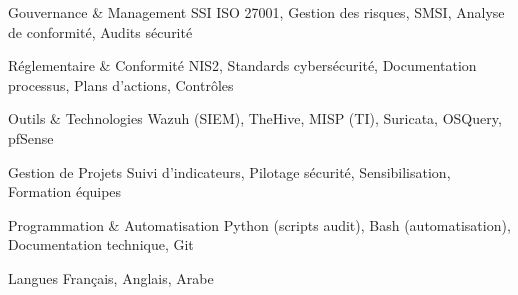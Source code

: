 
\begin{cvskills}

    \cvskill
    {Gouvernance \& Management SSI} %
    {ISO 27001, Gestion des risques, SMSI, Analyse de conformité, Audits sécurité} %

    \cvskill
    {Réglementaire \& Conformité} %
    {NIS2, Standards cybersécurité, Documentation processus, Plans d'actions, Contrôles} %

    \cvskill
    {Outils \& Technologies} %
    {Wazuh (SIEM), TheHive, MISP (TI), Suricata, OSQuery, pfSense} %

    \cvskill
    {Gestion de Projets} %
    {Suivi d'indicateurs, Pilotage sécurité, Sensibilisation, Formation équipes} %

    \cvskill
    {Programmation \& Automatisation} %
    {Python (scripts audit), Bash (automatisation), Documentation technique, Git} %

    \cvskill
    {Langues} %
    {Français, Anglais, Arabe} %

\end{cvskills}